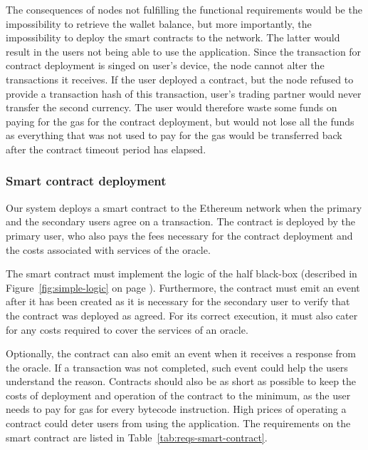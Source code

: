 The consequences of nodes not fulfilling the functional requirements would be the impossibility to retrieve the wallet balance, but more importantly, the impossibility to deploy the smart contracts to the network. The latter would result in the users not being able to use the application. Since the transaction for contract deployment is singed on user’s device, the node cannot alter the transactions it receives. If the user deployed a contract, but the node refused to provide a transaction hash of this transaction, user’s trading partner would never transfer the second currency. The user would therefore waste some funds on paying for the gas for the contract deployment, but would not lose all the funds as everything that was not used to pay for the gas would be transferred back after the contract timeout period has elapsed.

\subsubsection{Smart contract deployment}
Our system deploys a smart contract to the Ethereum network when the primary and the secondary users agree on a transaction. The contract is deployed by the primary user, who also pays the fees necessary for the contract deployment and the costs associated with services of the oracle\footnotemark.
% 

The smart contract must implement the logic of the half black-box (described in Figure~\ref{fig:simple-logic} on page \pageref{fig:simple-logic}). Furthermore, the contract must emit an event after it has been created as it is necessary for the secondary user to verify that the contract was deployed as agreed. For its correct execution, it must also cater for any costs required to cover the services of an oracle.

Optionally, the contract can also emit an event when it receives a response from the oracle. If a transaction was not completed, such event could help the users understand the reason. Contracts should also be as short as possible to keep the costs of deployment and operation of the contract to the minimum, as the user needs to pay for gas for every bytecode instruction. High prices of operating a contract could deter users from using the application. The requirements on the smart contract are listed in Table~\ref{tab:reqs-smart-contract}.

